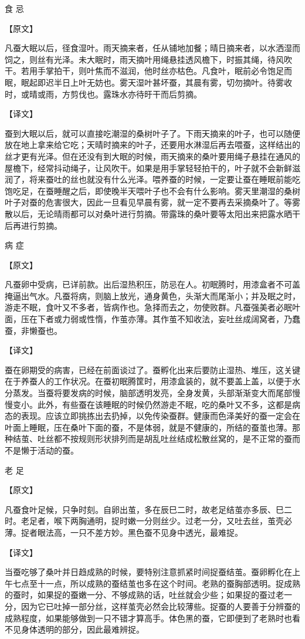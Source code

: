 \documentclass[12pt,UTF8]{ctexbook}
\begin{document}
食 忌

【原文】

凡蚕大眠以后，径食湿叶。雨天摘来者，任从铺地加餐；晴日摘来者，以水洒湿而饲之，则丝有光泽。未大眠时，雨天摘叶用绳悬挂透风檐下，时振其绳，待风吹干。若用手掌拍干，则叶焦而不滋润，他时丝亦枯色。凡食叶，眠前必令饱足而眠，眠起即迟半日上叶无妨也。雾天湿叶甚坏蚕，其晨有雾，切勿摘叶。待雾收时，或晴或雨，方剪伐也。露珠水亦待旴干而后剪摘。

【译文】

蚕到大眠以后，就可以直接吃潮湿的桑树叶子了。下雨天摘来的叶子，也可以随便放在地上拿来给它吃；天晴时摘来的叶子，还要用水淋湿后再去喂蚕，这样结出的丝才更有光泽。但在还没有到大眠的时候，雨天摘来的桑叶要用绳子悬挂在通风的屋檐下，经常抖动绳子，让风吹干。如果是用手掌轻轻拍干的，叶子就不会新鲜滋润了，将来蚕吐的丝也就没有什么光泽。喂养蚕的时候，一定要让蚕在睡眠前能吃饱吃足，在蚕睡醒之后，即使晚半天喂叶子也不会有什么影响。雾天里潮湿的桑树叶子对蚕的危害很大，因此一旦看见早晨有雾，就一定不要再去采摘桑叶了。等雾散以后，无论晴雨都可以对桑叶进行剪摘。带露珠的桑叶要等太阳出来把露水晒干后再进行剪摘。

病 症

【原文】

凡蚕卵中受病，已详前款。出后湿热积压，防忌在人。初眠腾时，用漆盒者不可盖掩逼出气水。凡蚕将病，则脑上放光，通身黄色，头渐大而尾渐小；并及眠之时，游走不眠，食叶又不多者，皆病作也。急择而去之，勿使败群。凡蚕强美者必眠叶面，压在下者或力弱或性惰，作茧亦薄。其作茧不知收法，妄吐丝成阔窝者，乃蠢蚕，非懒蚕也。

【译文】

蚕在卵期受的病害，已经在前面谈过了。蚕孵化出来后要防止湿热、堆压，这关键在于养蚕人的工作状况。在蚕初眠腾筐时，用漆盒装的，就不要盖上盖，以便于水分蒸发。当蚕将要发病的时候，脑部透明发亮，全身发黄，头部渐渐变大而尾部慢慢变小。此外，有些蚕在该睡眠的时候仍然游走不眠，吃的桑叶又不多，这都是病态的表现。应该立即挑拣出去扔掉，以免传染蚕群。健康而色泽美好的蚕一定会在叶面上睡眠，压在桑叶下面的蚕，不是体弱，就是不健康的，所结的蚕茧也薄。那种结茧、吐丝都不按规则形状排列而是胡乱吐丝结成松散丝窝的，是不正常的蚕而不是懒于活动的蚕。

老 足

【原文】

凡蚕食叶足候，只争时刻。自卵出茧，多在辰巳二时，故老足结茧亦多辰、巳二时。老足者，喉下两胸通明，捉时嫩一分则丝少。过老一分，又吐去丝，茧壳必薄。捉者眼法高，一只不差方妙。黑色蚕不见身中透光，最难捉。

【译文】

当蚕吃够了桑叶并日趋成熟的时候，要特别注意抓紧时间捉蚕结茧。蚕卵孵化在上午七点至十一点，所以成熟的蚕结茧也多在这个时间。老熟的蚕胸部透明。捉成熟的蚕时，如果捉的蚕嫩一分、不够成熟的话，吐丝就会少些；如果捉的蚕过老一分，因为它已吐掉一部分丝，这样茧壳必然会比较薄些。捉蚕的人要善于分辨蚕的成熟程度，如果能够做到一只不错才算高手。体色黑的蚕，它即便到了老熟时也看不见身体透明的部分，因此最难辨捉。
\end{document}
